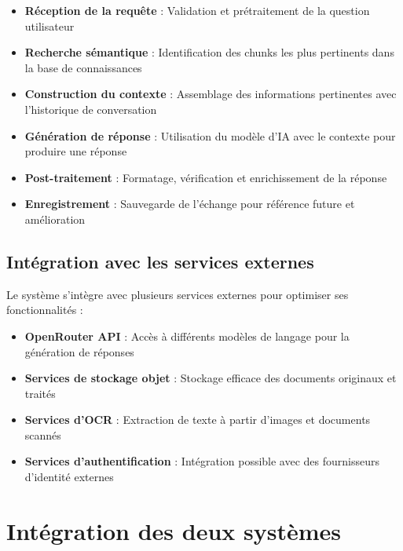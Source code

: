\begin{itemize}
  \item \textbf{Réception de la requête} : Validation et prétraitement de la question utilisateur
  
  \item \textbf{Recherche sémantique} : Identification des chunks les plus pertinents dans la base de connaissances
  
  \item \textbf{Construction du contexte} : Assemblage des informations pertinentes avec l'historique de conversation
  
  \item \textbf{Génération de réponse} : Utilisation du modèle d'IA avec le contexte pour produire une réponse
  
  \item \textbf{Post-traitement} : Formatage, vérification et enrichissement de la réponse
  
  \item \textbf{Enregistrement} : Sauvegarde de l'échange pour référence future et amélioration
\end{itemize}

\subsection{Intégration avec les services externes}

Le système s'intègre avec plusieurs services externes pour optimiser ses fonctionnalités :

\begin{itemize}
  \item \textbf{OpenRouter API} : Accès à différents modèles de langage pour la génération de réponses
  
  \item \textbf{Services de stockage objet} : Stockage efficace des documents originaux et traités
  
  \item \textbf{Services d'OCR} : Extraction de texte à partir d'images et documents scannés
  
  \item \textbf{Services d'authentification} : Intégration possible avec des fournisseurs d'identité externes
\end{itemize}

\section{Intégration des deux systèmes}

